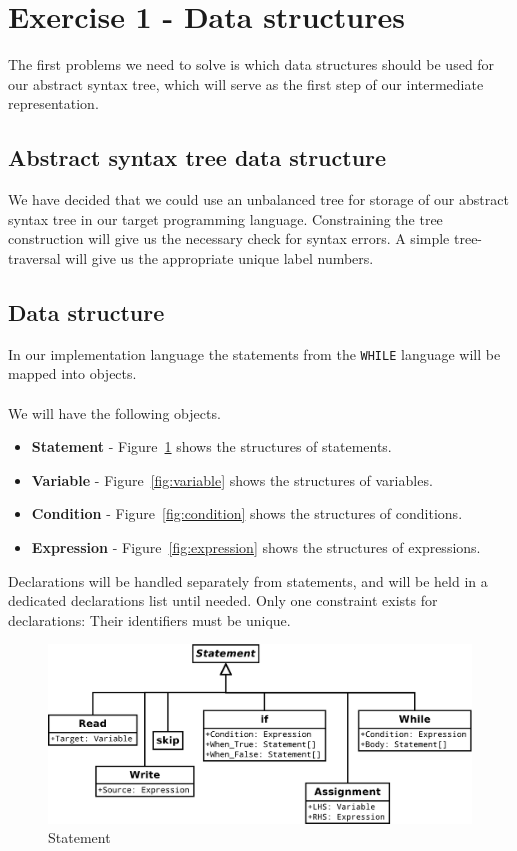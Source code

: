 \section{Exercise 1 - Data structures}
The first problems we need to solve is which data structures should be used for our abstract syntax tree, which will serve as the first step of our intermediate representation.

\subsection{Abstract syntax tree data structure}
We have decided that we could use an unbalanced tree for storage of our abstract syntax tree in our target programming language. Constraining the tree construction will give us the necessary check for syntax errors.
A simple tree-traversal will give us the appropriate unique label numbers.

\subsection{Data structure}
In our implementation language the statements from the \texttt{WHILE} language will be mapped into objects. 
\\\\
We will have the following objects.
\begin{itemize}
	\item \textbf{Statement} - Figure~\ref{fig:statement} shows the structures of statements.
	\item \textbf{Variable} - Figure~\ref{fig:variable} shows the structures of variables.
	\item \textbf{Condition} - Figure~\ref{fig:condition} shows the structures of conditions.
	\item \textbf{Expression} - Figure~\ref{fig:expression} shows the structures of expressions.
\end{itemize}
Declarations will be handled separately from statements, and will be held in a dedicated declarations list until needed. Only one constraint exists for declarations: Their identifiers must be unique.


\begin{figure}[h]
	\centering
	\includegraphics[scale=.3]{../fig/Statement}
	\caption{Statement}
	\label{fig:statement}
\end{figure}

